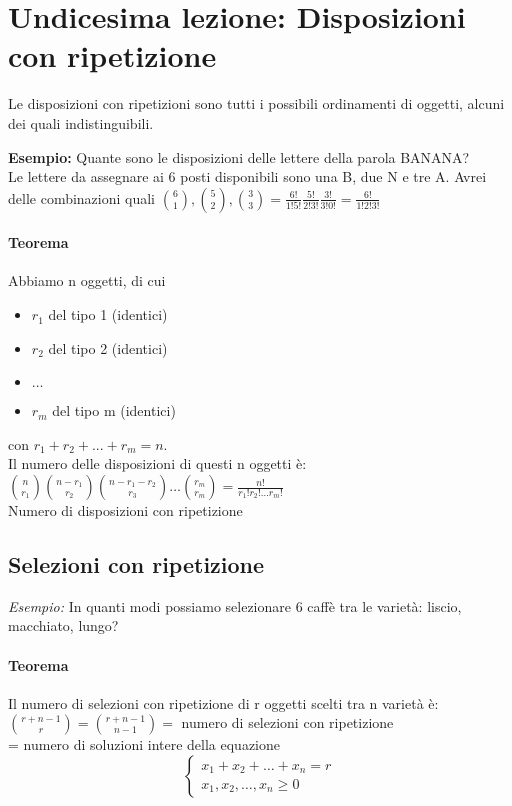\section{Undicesima lezione: Disposizioni con ripetizione}

Le disposizioni con ripetizioni sono tutti i possibili ordinamenti di oggetti, alcuni dei quali indistinguibili. 

\noindent
\textbf{Esempio:} Quante sono le disposizioni delle lettere della parola BANANA? \\
Le lettere da assegnare ai 6 posti disponibili sono una B, due N e tre A. Avrei delle combinazioni quali
\smallskip
\( \binom{6}{1}, \binom{5}{2}, \binom{3}{3} = \frac{6!}{1! 5!} \frac{5!}{2! 3!} \frac{3!}{3! 0!} = \frac{6!}{1! 2! 3!}\)

\paragraph{Teorema} 
Abbiamo n oggetti, di cui
\begin{itemize}
    \item $r_1$ del tipo 1 (identici)
    \item $r_2$ del tipo 2 (identici)
    \item $\dots$
    \item $r_m$ del tipo m (identici)
\end{itemize}
con $r_1 + r_2 + ... + r_m = n$. \\
Il numero delle disposizioni di questi n oggetti è:\\
\smallskip
\( \binom{n}{r_1} \binom{n-r_1}{r_2} \binom{n-r_1-r_2}{r_3} \dots  \binom{r_m}{r_m} = \frac{n!}{r_1 ! r_2 ! \dots r_m !} \) \\
Numero di disposizioni con ripetizione 


\subsection{Selezioni con ripetizione}
\textit{Esempio:} In quanti modi possiamo selezionare 6 caffè tra le varietà: liscio, macchiato, lungo? \\


\paragraph{Teorema}
Il numero di selezioni con ripetizione di r oggetti scelti tra n varietà è: \\
\smallskip
\( \binom{r + n -1}{r}= \binom{r+n-1}{n-1}= \) numero di selezioni con ripetizione \\
= numero di soluzioni intere della equazione
\[ \left\{ 
    \begin{array}{rcl} 
    x_1 + x_2 + \dots + x_n = r \\
    x_1, x_2, \dots, x_n \geq 0
\end{array} 
\right. \]

